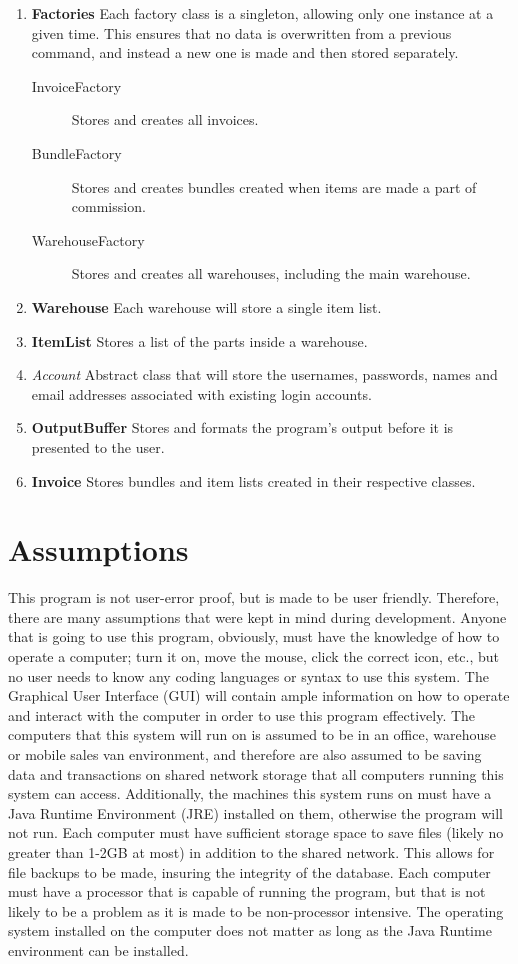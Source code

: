 \documentclass{report}
\begin{document}
\begin{enumerate}
  \item \textbf{Factories} Each factory class is a singleton, allowing only one instance at a given time. This ensures that no data is overwritten from a previous command, and instead a new one is made and then stored separately.
    \begin{description}
      \item [InvoiceFactory] Stores and creates all invoices.
      \item [BundleFactory] Stores and creates bundles created when items are made a part of commission.
      \item [WarehouseFactory] Stores and creates all warehouses, including the main warehouse.
    \end{description}
  \item \textbf{Warehouse} Each warehouse will store a single item list.
  \item \textbf{ItemList} Stores a list of the parts inside a warehouse.
  \item \textit{Account} Abstract class that will store the usernames, passwords, names and email addresses associated with existing login accounts.
  \item \textbf{OutputBuffer} Stores and formats the program’s output before it is presented to the user.
  \item \textbf{Invoice} Stores bundles and item lists created in their respective classes.
\end{enumerate}

\section{Assumptions}

This program is not user-error proof, but is made to be user friendly. Therefore, there are many assumptions that were kept in mind during development. Anyone that is going to use this program, obviously, must have the knowledge of how to operate a computer; turn it on, move the mouse, click the correct icon, etc., but no user needs to know any coding languages or syntax to use this system. The Graphical User Interface (GUI) will contain ample information on how to operate and interact with the computer in order to use this program effectively. The computers that this system will run on is assumed to be in an office, warehouse or mobile sales van environment, and therefore are also assumed to be saving data and transactions on shared network storage that all computers running this system can access. Additionally, the machines this system runs on must have a Java Runtime Environment (JRE) installed on them, otherwise the program will not run. Each computer must have sufficient storage space to save files (likely no greater than 1-2GB at most) in addition to the shared network. This allows for file backups to be made, insuring the integrity of the database. Each computer must have a processor that is capable of running the program, but that is not likely to be a problem as it is made to be non-processor intensive. The operating system installed on the computer does not matter as long as the Java Runtime environment can be installed.\par
\end{document}
